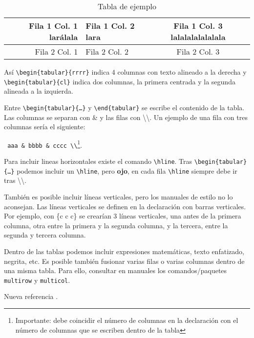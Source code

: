 \begin{table}[htp]
    \caption{Tabla de ejemplo}
    \label{tab:tabla_ejemplo}
    \begin{center}
         \begin{tabular}{rlc}\hline
              Fila 1 Col. 1 larálala & Fila 1 Col. 2 lara & Fila 1 Col. 3  lalalalalalalala\\ \hline
              Fila 2 Col. 1 & Fila 2 Col. 2 & Fila 2 Col. 3 \\ \hline
         \end{tabular}
    \end{center}
\end{table}

Así \texttt{\textbackslash begin\{tabular\}\{rrrr\}} indica 4 columnas con texto alineado a la derecha y \texttt{\textbackslash begin\{tabular\}\{cl\}} indica dos columnas, la primera centrada y la segunda alineada a la izquierda.

Entre \texttt{\textbackslash begin\{tabular\}\{\ldots\}} y \texttt{\textbackslash end\{tabular\}} se escribe el contenido de la tabla. Las columnas se separan con \& y las filas con \textbackslash \textbackslash. Un ejemplo de una fila con tres columnas sería el siguiente:
\begin{center}
    \texttt{ aaa \& bbbb \& cccc \textbackslash \textbackslash}\footnote{Importante: debe coincidir el número de columnas en la declaración con el número de columnas que se escriben dentro de la tabla}. 
\end{center}

Para incluir lineas horizontales existe el comando \texttt{\textbackslash hline}. Tras \texttt{\textbackslash begin\{tabular\}\{\ldots\}} podemos incluir un \texttt{\textbackslash hline}, pero \textbf{ojo}, en cada fila \texttt{\textbackslash hline} siempre debe ir tras \textbackslash \textbackslash.

También es posible incluir líneas verticales, pero los manuales de estilo no lo aconsejan. Las líneas verticales se definen en la declaración con barras verticales. Por ejemplo, con \{\textbar c  \textbar c \textbar c\}  se crearían 3 líneas verticales, una antes de la primera columna, otra entre la primera y la segunda columna, y la tercera, entre la segunda y tercera columna.

Dentro de las tablas podemos incluir expresiones matemáticas, texto enfatizado, negrita, etc. Es posible también fusionar varias filas o varias columnas dentro de una misma tabla. Para ello, consultar en manuales los comandos/paquetes \texttt{multirow} y \texttt{multicol}.


Nueva referencia \cite{milibro}.

